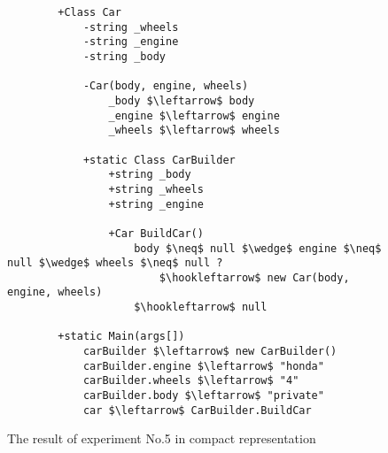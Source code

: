 \begin{figure}[H]
	\lstset{extendedchars=false,
		escapeinside=/}
	\begin{lstlisting}
		+Class Car
			-string _wheels
			-string _engine
			-string _body
			
			-Car(body, engine, wheels)
				_body $\leftarrow$ body
				_engine $\leftarrow$ engine
				_wheels $\leftarrow$ wheels
			
			+static Class CarBuilder
				+string _body
				+string _wheels
				+string _engine
				
				+Car BuildCar()
					body $\neq$ null $\wedge$ engine $\neq$ null $\wedge$ wheels $\neq$ null ?
						$\hookleftarrow$ new Car(body, engine, wheels)
					$\hookleftarrow$ null
		
		+static Main(args[])
			carBuilder $\leftarrow$ new CarBuilder()
			carBuilder.engine $\leftarrow$ "honda"
			carBuilder.wheels $\leftarrow$ "4"
			carBuilder.body $\leftarrow$ "private"
			car $\leftarrow$ CarBuilder.BuildCar
	\end{lstlisting}
	\caption{The result of experiment No.5 in compact representation}
	\label{fig16}
\end{figure}
